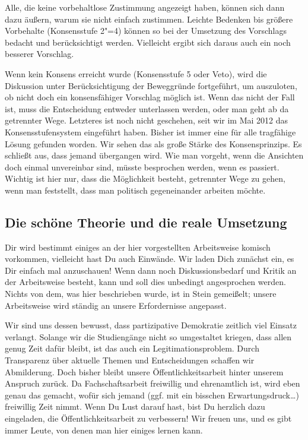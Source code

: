 Alle, die keine vorbehaltlose Zustimmung angezeigt haben, können sich dann dazu äußern, warum sie nicht einfach zustimmen. Leichte Bedenken bis größere Vorbehalte (Konsensstufe 2"=4) können so bei der Umsetzung des Vorschlags bedacht und berücksichtigt werden. Vielleicht ergibt sich daraus auch ein noch besserer Vorschlag.

Wenn kein Konsens erreicht wurde (Konsensstufe 5 oder Veto), wird die Diskussion unter Berücksichtigung der Beweggründe fortgeführt, um auszuloten, ob nicht doch ein konsensfähiger Vorschlag möglich ist. Wenn das nicht der Fall ist, muss die Entscheidung entweder unterlassen werden, oder man geht ab da getrennter Wege. Letzteres ist noch nicht geschehen, seit wir im Mai 2012 das Konsensstufensystem eingeführt haben.
Bisher ist immer eine für alle tragfähige Lösung gefunden worden. Wir sehen das als große Stärke des Konsensprinzips. Es schließt aus, dass jemand übergangen wird. Wie man vorgeht, wenn die Ansichten doch einmal unvereinbar sind, müsste besprochen werden, wenn es passiert. Wichtig ist hier nur, dass die Möglichkeit besteht, getrennter Wege zu gehen, wenn man feststellt, dass man politisch gegeneinander arbeiten möchte.

\vspace*{\parskip}\null

\noindent\framebox{\parbox{\textwidth}{}}

\subsection{Die schöne Theorie und die reale Umsetzung}

Dir wird bestimmt einiges an der hier vorgestellten Arbeitsweise komisch vorkommen, vielleicht hast Du auch Einwände. Wir laden Dich zunächst ein, es Dir einfach mal anzuschauen! Wenn dann noch Diskussionsbedarf und Kritik an der Arbeitsweise besteht, kann und soll dies unbedingt angesprochen werden. Nichts von dem, was hier beschrieben wurde, ist in Stein gemeißelt; unsere Arbeitsweise wird ständig an unsere Erfordernisse angepasst.

Wir sind uns dessen bewusst, dass partizipative Demokratie zeitlich viel Einsatz verlangt. Solange wir die Studiengänge nicht so umgestaltet kriegen, dass allen genug Zeit dafür bleibt, ist das auch ein Legitimationsproblem. Durch Transparenz über aktuelle Themen und Entscheidungen schaffen wir Abmilderung. Doch bisher bleibt unsere Öffentlichkeitsarbeit hinter unserem Anspruch zurück. Da Fachschaftsarbeit freiwillig und ehrenamtlich ist, wird eben genau das gemacht, wofür sich jemand (ggf. mit ein bisschen Erwartungsdruck\dots) freiwillig Zeit nimmt. Wenn Du Lust darauf hast, bist Du herzlich dazu eingeladen, die Öffentlichkeitsarbeit zu verbessern! Wir freuen uns, und es gibt immer Leute, von denen man hier einiges lernen kann.

